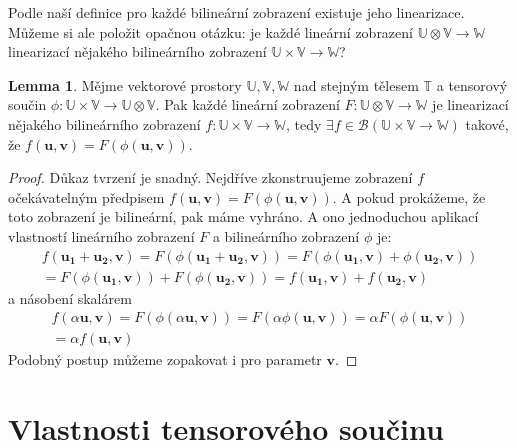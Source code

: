 \documentclass[a5paper,12pt]{amsbook}
\theoremstyle{definition}
\newtheorem{lemma}[theorem]{Lemma}
\newcommand{\myvec}[1]{\bm{#1}}
\newcommand{\myspace}[1]{\mathbb{#1}}
\begin{document}
\noindent
Podle naší definice pro každé bilineární zobrazení existuje jeho linearizace. Můžeme si ale položit
opačnou otázku: je každé lineární zobrazení $\myspace{U}\otimes\myspace{V}\rightarrow\myspace{W}$
linearizací nějakého bilineárního zobrazení $\myspace{U}\times\myspace{V}\rightarrow\myspace{W}$?

\begin{lemma}
\label{lemma:lin_to_bilin}
Mějme vektorové prostory $\myspace{U}, \myspace{V}, \myspace{W}$ nad stejným tělesem $\myspace{T}$
a tensorový součin $\phi: \myspace{U}\times\myspace{V}\rightarrow\myspace{U}\otimes\myspace{V}$.
Pak každé lineární zobrazení $F: \myspace{U}\otimes\myspace{V}\rightarrow\myspace{W}$ je linearizací
nějakého bilineárního zobrazení $f: \myspace{U}\times\myspace{V}\rightarrow\myspace{W}$,
tedy $\exists f \in \mathcal{B}(\myspace{U}\times\myspace{V}\rightarrow\myspace{W})$ takové, že
$f(\myvec{u}, \myvec{v}) = F(\phi(\myvec{u}, \myvec{v}))$.
\end{lemma}

\begin{proof}
Důkaz tvrzení je snadný. Nejdříve zkonstruujeme zobrazení $f$ očekávatelným předpisem
$f(\myvec{u}, \myvec{v}) = F(\phi(\myvec{u}, \myvec{v}))$. A pokud prokážeme, že toto zobrazení
je bilineární, pak máme vyhráno. A ono jednoduchou aplikací vlastností lineárního zobrazení
$F$ a bilineárního zobrazení $\phi$ je:
\begin{equation*}
\begin{split}
f(\myvec{u_1} + \myvec{u_2}, \myvec{v}) = F(\phi(\myvec{u_1} + \myvec{u_2}, \myvec{v}))
  = F(\phi(\myvec{u_1}, \myvec{v}) + \phi(\myvec{u_2}, \myvec{v})) \\
= F(\phi(\myvec{u_1}, \myvec{v})) + F(\phi(\myvec{u_2}, \myvec{v}))
  = f(\myvec{u_1}, \myvec{v}) + f(\myvec{u_2}, \myvec{v})
\end{split}
\end{equation*}
a násobení skalárem
\begin{equation*}
\begin{split}
f(\alpha\myvec{u}, \myvec{v}) = F(\phi(\alpha\myvec{u}, \myvec{v}))
= F(\alpha\phi(\myvec{u}, \myvec{v}))
= \alpha F(\phi(\myvec{u}, \myvec{v})) \\
= \alpha f(\myvec{u}, \myvec{v})
\end{split}
\end{equation*}
Podobný postup můžeme zopakovat i pro parametr $\myvec{v}$.
\end{proof}

\section{Vlastnosti tensorového součinu}
\end{document}
